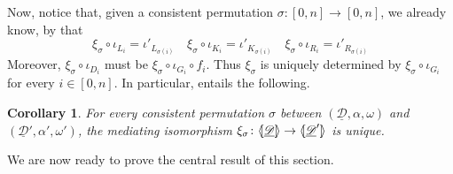 \documentclass[a4paper]{article}
\newcommand{\dder}[1]{\mathscr{#1}}
\newcommand{\der}[1]{\underline{\dder{#1}}}
\newcommand{\lpro}{\langle \hspace{-1.85pt}[}
\newcommand{\rpro}{]\hspace{-1.85pt}\rangle}
\newcommand{\tpro}[1]{\lpro \der{#1}\rpro}
\newtheorem{corollary}[theorem]{Corollary}
\theoremstyle{definition}
\begin{document}
Now, notice that, given a consistent permutation $\sigma\colon [0,n]\to[0,n]$, we already know, by  that
\[\xi_\sigma \circ \iota_{L_i}=\iota'_{L_{\sigma(i)}} \quad \xi_\sigma \circ \iota_{K_i}=\iota'_{K_{\sigma(i)}} \quad \xi_\sigma \circ \iota_{R_i}=\iota'_{R_{\sigma(i)}} \]
	Moreover, $\xi_\sigma \circ \iota_{D_i}$ must be $\xi_\sigma \circ \iota_{G_i}\circ f_i$. Thus $\xi_\sigma$ is uniquely determined by $\xi_{\sigma} \circ \iota_{G_i}$ for every $i\in [0, n]$. In particular,   entails the following.
\begin{corollary} For every consistent permutation $\sigma$ between  $(\der{D}, \alpha, \omega)$ and $(\der{D}', \alpha', \omega')$, the mediating isomorphism $\xi_\sigma\colon \tpro{D}\to \lpro \der{D}'\rpro$ is unique.
\end{corollary}

We are now ready to prove the central result of this section. 
\end{document}
